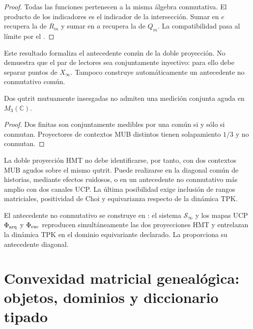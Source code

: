 \begin{proof}
Todas las funciones pertenecen a la misma álgebra conmutativa. El producto
de los indicadores es el indicador de la intersección. Sumar en $e$ recupera
la \PVM de $R_m$ y sumar en $a$ recupera la de $Q_m$. La compatibilidad pasa
al límite por el .
\end{proof}

Este resultado formaliza el antecedente común de la doble proyección. No
demuestra que el par de lectores sea conjuntamente inyectivo: para ello debe
separar puntos de $X_\infty$. Tampoco construye automáticamente un antecedente
no conmutativo común.

\begin{proposition}
Dos \PVM qutrit mutuamente insesgadas no admiten una medición conjunta aguda
en $M_3(\mathbb C)$.
\end{proposition}

\begin{proof}
Dos \PVM finitas son conjuntamente medibles por una \PVM común si y sólo si
conmutan. Proyectores de contextos MUB distintos tienen solapamiento $1/3$ y
no conmutan.
\end{proof}

\enlargethispage{3\baselineskip}
La doble proyección HMT no debe identificarse, por tanto, con dos contextos
MUB agudos sobre el mismo qutrit. Puede realizarse en la diagonal común de
historias, mediante efectos ruidosos, o en un antecedente no conmutativo más
amplio con dos canales UCP. La última posibilidad exige inclusión de rangos
matriciales, positividad de Choi y equivarianza respecto de la dinámica TPK.

\begin{workbox}[fontupper=\footnotesize,fonttitle=\bfseries\footnotesize,
  boxsep=1pt,left=4pt,right=4pt,top=0pt,bottom=0pt,
  toptitle=1pt,bottomtitle=1pt]
El antecedente no conmutativo se construye en
: el sistema $\mathcal S_\infty$ y los mapas UCP
$\Phi_{\rm arq}$ y $\Phi_{\rm exc}$ reproducen simultáneamente las dos
proyecciones HMT y entrelazan la dinámica TPK en el dominio equivariante
declarado. La 
proporciona su antecedente diagonal.
\end{workbox}
\fi


\section{Convexidad matricial genealógica: objetos, dominios y diccionario
tipado}

